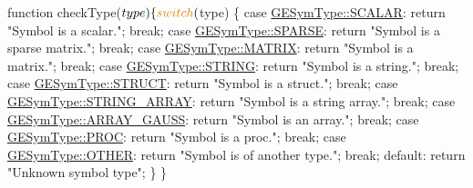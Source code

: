 \begin{DoxyCode}
\textcolor{keyword}{function} checkType($type) \{
    \textcolor{keywordflow}{switch} ($type) \{
        \textcolor{keywordflow}{case} \hyperlink{struct_g_e_sym_type__s_a4868e0d2833270b164c4a78b497f4fdc}{GESymType::SCALAR}:
            \textcolor{keywordflow}{return} \textcolor{stringliteral}{"Symbol is a scalar."};
            \textcolor{keywordflow}{break};
        \textcolor{keywordflow}{case} \hyperlink{struct_g_e_sym_type__s_a17bff9bfcefd9f4c639d20d256f20a7d}{GESymType::SPARSE}:
            \textcolor{keywordflow}{return} \textcolor{stringliteral}{"Symbol is a sparse matrix."};
            \textcolor{keywordflow}{break};
        \textcolor{keywordflow}{case} \hyperlink{struct_g_e_sym_type__s_a3874c4c2df1ed454c13722031e582f66}{GESymType::MATRIX}:
            \textcolor{keywordflow}{return} \textcolor{stringliteral}{"Symbol is a matrix."};
            \textcolor{keywordflow}{break};
        \textcolor{keywordflow}{case} \hyperlink{struct_g_e_sym_type__s_a0e719c96f22a8453e460f7d87a09696a}{GESymType::STRING}:
            \textcolor{keywordflow}{return} \textcolor{stringliteral}{"Symbol is a string."};
            \textcolor{keywordflow}{break};
        \textcolor{keywordflow}{case} \hyperlink{struct_g_e_sym_type__s_a7abc9ab4e83c0b99f9fde37450489944}{GESymType::STRUCT}:
            \textcolor{keywordflow}{return} \textcolor{stringliteral}{"Symbol is a struct."};
            \textcolor{keywordflow}{break};
        \textcolor{keywordflow}{case} \hyperlink{struct_g_e_sym_type__s_a8b841bad6dacbbacf0d423219bd08a98}{GESymType::STRING\_ARRAY}:
            \textcolor{keywordflow}{return} \textcolor{stringliteral}{"Symbol is a string array."};
            \textcolor{keywordflow}{break};
        \textcolor{keywordflow}{case} \hyperlink{struct_g_e_sym_type__s_ae49660fdf27d7d165463abb2ccc941e4}{GESymType::ARRAY\_GAUSS}:
            \textcolor{keywordflow}{return} \textcolor{stringliteral}{"Symbol is an array."};
            \textcolor{keywordflow}{break};
        \textcolor{keywordflow}{case} \hyperlink{struct_g_e_sym_type__s_a117901fdf3914c09101a90fe7867f111}{GESymType::PROC}:
            \textcolor{keywordflow}{return} \textcolor{stringliteral}{"Symbol is a proc."};
            \textcolor{keywordflow}{break};
        \textcolor{keywordflow}{case} \hyperlink{struct_g_e_sym_type__s_ae27a11fce0f32a022df8925068b4257c}{GESymType::OTHER}:
            \textcolor{keywordflow}{return} \textcolor{stringliteral}{"Symbol is of another type."};
            \textcolor{keywordflow}{break};
        \textcolor{keywordflow}{default}:
            \textcolor{keywordflow}{return} \textcolor{stringliteral}{"Unknown symbol type"};
    \}
\}


\end{DoxyCode}
